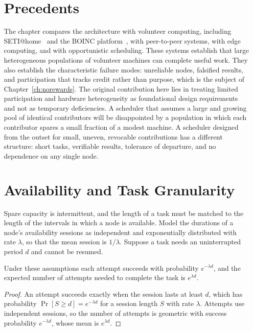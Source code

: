 \section{Precedents}

The chapter compares the architecture with volunteer computing, including SETI@home~\cite{anderson2002} and the BOINC platform~\cite{anderson2004}, with peer-to-peer systems, with edge computing, and with opportunistic scheduling. These systems establish that large heterogeneous populations of volunteer machines can complete useful work. They also establish the characteristic failure modes: unreliable nodes, falsified results, and participation that tracks credit rather than purpose, which is the subject of Chapter~\ref{ch:norewards}. The original contribution here lies in treating limited participation and hardware heterogeneity as foundational design requirements and not as temporary deficiencies. A scheduler that assumes a large and growing pool of identical contributors will be disappointed by a population in which each contributor spares a small fraction of a modest machine. A scheduler designed from the outset for small, uneven, revocable contributions has a different structure: short tasks, verifiable results, tolerance of departure, and no dependence on any single node.

\section{Availability and Task Granularity}

Spare capacity is intermittent, and the length of a task must be matched to the length of the intervals in which a node is available. Model the durations of a node's availability sessions as independent and exponentially distributed with rate $\lambda$, so that the mean session is $1/\lambda$. Suppose a task needs an uninterrupted period $d$ and cannot be resumed.

\begin{proposition}
\label{prop:attempts}
Under these assumptions each attempt succeeds with probability $e^{-\lambda d}$, and the expected number of attempts needed to complete the task is $e^{\lambda d}$.
\end{proposition}

\begin{proof}
An attempt succeeds exactly when the session lasts at least $d$, which has probability $\Pr[S\ge d]=e^{-\lambda d}$ for a session length $S$ with rate $\lambda$. Attempts use independent sessions, so the number of attempts is geometric with success probability $e^{-\lambda d}$, whose mean is $e^{\lambda d}$.
\end{proof}

